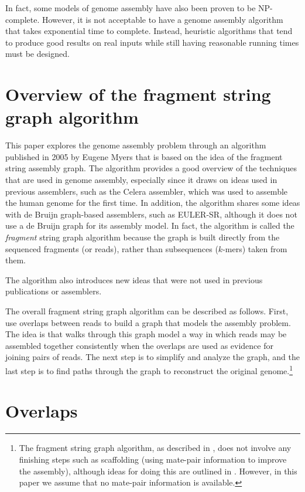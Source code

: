 \documentclass[12pt]{article}
\begin{document}
In fact, some models of genome assembly have also been proven to be
NP-complete\cite{Medvedev2007}.  However, it is not acceptable to have a genome
assembly algorithm that takes exponential time to complete.  Instead, heuristic
algorithms that tend to produce good results on real inputs while still having
reasonable running times must be designed.

\section{Overview of the fragment string graph algorithm}

This paper explores the genome assembly problem through an algorithm published
in 2005 by Eugene Myers that is based on the idea of the fragment string
assembly graph\cite{Myers2005}.  The algorithm provides a good overview of the
techniques that are used in genome assembly, especially since it draws on ideas
used in previous assemblers, such as the Celera assembler, which was used to
assemble the human genome for the first time\cite{Venter2001}.  In addition, the
algorithm shares some ideas with de Bruijn graph-based assemblers, such as
EULER-SR\cite{Pevzner2001}, although it does not use a de Bruijn graph for its
assembly model.  In fact, the algorithm is called the {\em fragment} string
graph algorithm because the graph is built directly from the sequenced fragments
(or reads), rather than subsequences ($k$-mers) taken from them.

The algorithm also introduces new ideas that were not used in previous
publications or assemblers.

The overall fragment string graph algorithm can be described as follows.  First,
use overlaps between reads to build a graph that models the assembly problem.
The idea is that walks through this graph model a way in which reads may be
assembled together consistently when the overlaps are used as evidence for
joining pairs of reads.  The next step is to simplify and analyze the graph, and
the last step is to find paths through the graph to reconstruct the original
genome.\footnote{The fragment string graph algorithm, as described in
\cite{Myers2005}, does not involve any finishing steps such as scaffolding
(using mate-pair information to improve the assembly), although ideas for doing
this are outlined in \cite{Medvedev2009}.  However, in this paper we assume that
no mate-pair information is available.}

\section{Overlaps}
\end{document}
